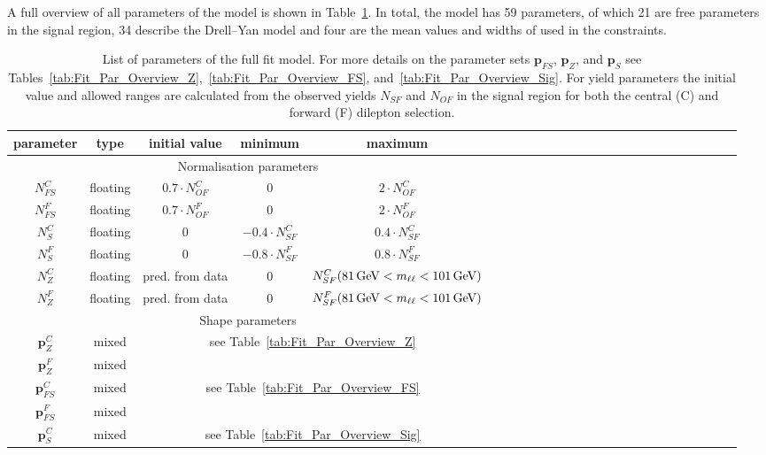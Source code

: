 A full overview of all parameters of the model is shown in Table~\ref{tab:Fit_Par_Overview_Full}. In total, the model has 59 parameters, of which 21 are free parameters in the signal region, 34 describe the Drell--Yan model and four are the mean values and widths of \Rsfof used in the constraints. 


\begin{table}[htbp]
\begin{center}
 \renewcommand{\arraystretch}{1.3}
 \caption{List of parameters of the full fit model. For more details on the parameter sets $\mathbf{p}_{FS}$, $\mathbf{p}_{Z}$, and $\mathbf{p}_{S}$ see Tables~\ref{tab:Fit_Par_Overview_Z},~\ref{tab:Fit_Par_Overview_FS}, and~\ref{tab:Fit_Par_Overview_Sig}. For yield parameters the initial value and allowed ranges are calculated from the observed yields $N_{SF}$ and $N_{OF}$ in the signal region for both the central (C) and forward (F) dilepton selection. \label{tab:Fit_Par_Overview_Full}}
\begin{tabular}{c|c|c|c|ccccccccccccccccccccc}
parameter & type & initial value & minimum & maximum \\ \hline
\multicolumn{5}{c}{Normalisation parameters}\\ \hline
$N_{FS}^{C}$ & floating & $0.7\cdot N_{OF}^{C}$ & 0 & $2\cdot N_{OF}^{C}$ \\
$N_{FS}^{F}$ & floating & $0.7\cdot N_{OF}^{F}$ & 0 & $2\cdot N_{OF}^{F}$ \\
$N_{S}^{C}$ & floating & 0 &  $-0.4\cdot N_{SF}^{C}$ &  $0.4\cdot N_{SF}^{C}$ \\
$N_{S}^{F}$ & floating & 0 &  $-0.8\cdot N_{SF}^{F}$ &  $0.8\cdot N_{SF}^{F}$ \\
$N_{Z}^{C}$ & floating & pred. from data & 0 & $N_{SF}^{C}(81\,\mathrm{Ge\hspace{-.08em}V} < m_{\ell\ell} < 101\,\mathrm{Ge\hspace{-.08em}V})$ \\
$N_{Z}^{F}$ & floating & pred. from data & 0 & $N_{SF}^{F}(81\,\mathrm{Ge\hspace{-.08em}V} < m_{\ell\ell} < 101\,\mathrm{Ge\hspace{-.08em}V})$ \\ \hline
\multicolumn{5}{c}{Shape parameters} \\ \hline
$\mathbf{p}_{Z}^{C}$ & mixed & \multicolumn{3}{c}{\multirow{2}{*}{see Table~\ref{tab:Fit_Par_Overview_Z}}}\\
$\mathbf{p}_{Z}^{F}$ & mixed & \multicolumn{3}{c}{}\\
$\mathbf{p}_{FS}^{C}$ & mixed & \multicolumn{3}{c}{\multirow{2}{*}{see Table~\ref{tab:Fit_Par_Overview_FS}}}\\
$\mathbf{p}_{FS}^{F}$ & mixed & \multicolumn{3}{c}{}\\
$\mathbf{p}_{S}^{C}$ & mixed & \multicolumn{3}{c}{\multirow{2}{*}{see Table~\ref{tab:Fit_Par_Overview_Sig}}}\\

\end{tabular}
\end{center}
\end{table}
